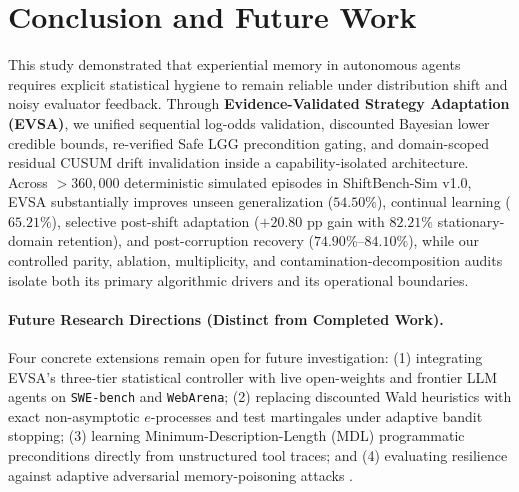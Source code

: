 \documentclass[10pt,letterpaper]{article}
\begin{document}
\section{Conclusion and Future Work}
This study demonstrated that experiential memory in autonomous agents requires explicit statistical hygiene to remain reliable under distribution shift and noisy evaluator feedback. Through \textbf{Evidence-Validated Strategy Adaptation (EVSA)}, we unified sequential log-odds validation, discounted Bayesian lower credible bounds, re-verified Safe LGG precondition gating, and domain-scoped residual CUSUM drift invalidation inside a capability-isolated architecture. Across $>360{,}000$ deterministic simulated episodes in ShiftBench-Sim v1.0, EVSA substantially improves unseen generalization ($54.50\%$), continual learning ($65.21\%$), selective post-shift adaptation ($+20.80\text{ pp}$ gain with $82.21\%$ stationary-domain retention), and post-corruption recovery ($74.90\%\text{--}84.10\%$), while our controlled parity, ablation, multiplicity, and contamination-decomposition audits isolate both its primary algorithmic drivers and its operational boundaries.

\paragraph{Future Research Directions (Distinct from Completed Work).}
Four concrete extensions remain open for future investigation: (1) integrating EVSA's three-tier statistical controller with live open-weights and frontier LLM agents on \texttt{SWE-bench} and \texttt{WebArena}; (2) replacing discounted Wald heuristics with exact non-asymptotic $e$-processes and test martingales \cite{howard2021time,ramdas2023game} under adaptive bandit stopping; (3) learning Minimum-Description-Length (MDL) programmatic preconditions directly from unstructured tool traces; and (4) evaluating resilience against adaptive adversarial memory-poisoning attacks \cite{chen2024agentpoison,zou2025poisonedrag}.

\small


\normalsize

\end{document}
